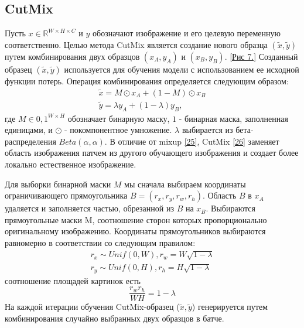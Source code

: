 \subsection{CutMix}
Пусть $x \in \mathbb{R}^{W \times H \times C}$ и $y$ обозначают изображение и его целевую переменную соответственно. Целью метода CutMix является создание нового образца $(\tilde{x}, \tilde{y})$ путем комбинирования двух образцов $(x_A, y_A)$ и $(x_B, y_B)$. \hyperlink{image7}{[Рис 7.]} Созданный образец $(\tilde{x}, \tilde{y})$ используется для обучения модели с использованием ее исходной функции потерь. Операция комбинирования определяется следующим образом:
\begin{equation}
\begin{split}
\tilde{x} = M \odot x_A + (1 - M) \odot x_B \\
\tilde{y} = \lambda y_A + (1 - \lambda) y_B,
\end{split}
\end{equation}
где $M \in {0, 1}^{W \times H}$ обозначает бинарную маску, $1$ - бинарная маска, заполненная единицами, и $\odot$ - покомпонентное умножение. $\lambda$ выбирается из бета-распределения $Beta(\alpha, \alpha)$. В отличие от mixup \hyperlink{cite.Hon17}{[25]}, CutMix \hyperlink{cite.Yun19}{[26]} заменяет область изображения патчем из другого обучающего изображения и создает более локально естественное изображение.

Для выборки бинарной маски $M$ мы сначала выбираем координаты ограничивающего прямоугольника $B = (r_x, r_y, r_w, r_h)$. Область $B$ в $x_A$ удаляется и заполняется частью, обрезанной из $B$ на $x_B$. Выбираются прямоугольные маски M, соотношение сторон которых пропорционально оригинальному изображению. Координаты прямоугольников выбираются равномерно в соответствии со следующим правилом:
\begin{equation}
\begin{split}
r_x \sim Unif (0, W), r_w = W \sqrt{1 - \lambda} \\
r_y \sim Unif (0, H), r_h = H \sqrt{1 - \lambda}
\end{split}
\end{equation}
соотношение площадей картинок есть 
\begin{equation}
\frac{r_w r_h}{WH} = 1 - \lambda
\end{equation}
На каждой итерации обучения CutMix-образец ($\tilde{x}, \tilde{y}$) генерируется путем комбинирования случайно выбранных двух образцов в батче.

